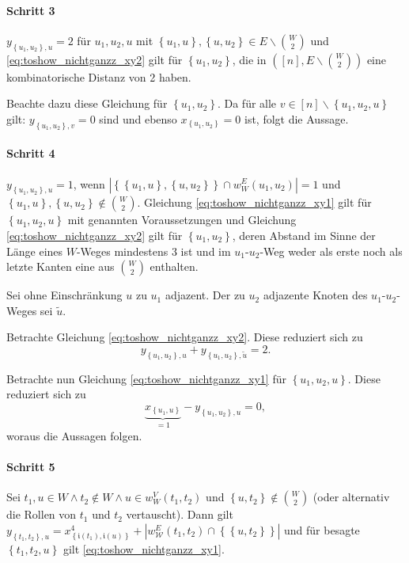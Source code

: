 \documentclass[10p,a4paper,BCOR = 12mm, DIV=15]{scrbook}
\begin{document}
\begin{bew}
\paragraph{Schritt 3}
$y_{\left\{u_1, u_2\right\}, u} = 2$ für $u_1, u_2, u$ mit $\left\{u_1, u\right\}, \left\{u, u_2\right\} \in E \backslash {W \choose 2}$ und \eqref{eq:toshow_nichtganzz_xy2} gilt für $\left\{u_1, u_2\right\}$, die in $\left(\left[n\right], E \backslash  {W \choose 2}\right)$ eine kombinatorische Distanz von 2 haben.

Beachte dazu diese Gleichung für $\left\{u_1, u_2\right\}$. Da für alle $v \in \left[n\right] \backslash \left\{u_1, u_2, u\right\}$ gilt: $y_{\left\{u_1, u_2\right\}, v}  = 0$ sind und ebenso $x_{\left\{u_1, u_2\right\}} = 0$ ist, folgt die Aussage.

\paragraph{Schritt 4}
$y_{\left\{u_1, u_2\right\}, u} = 1$, wenn $\left|\left\{\left\{u_1, u\right\}, \left\{u, u_2\right\}\right\} \cap w_W^E\left(u_1, u_2\right)\right| = 1$ und $\left\{u_1, u\right\}, \left\{u, u_2\right\} \notin {W \choose 2}$. Gleichung \eqref{eq:toshow_nichtganzz_xy1} gilt für $\left\{u_1, u_2, u\right\}$ mit genannten Voraussetzungen und
Gleichung \eqref{eq:toshow_nichtganzz_xy2} gilt für $\left\{u_1, u_2\right\}$, deren Abstand im Sinne der Länge eines $W$-Weges mindestens 3 ist und im $u_1$-$u_2$-Weg weder als erste noch als letzte Kanten eine aus ${W \choose 2}$ enthalten.

Sei ohne Einschränkung $u$ zu $u_1$ adjazent. Der zu $u_2$ adjazente Knoten des $u_1$-$u_2$-Weges sei $\widetilde{u}$.

Betrachte Gleichung \eqref{eq:toshow_nichtganzz_xy2}. Diese reduziert sich zu
\begin{displaymath}
y_{\left\{u_1, u_2\right\}, u} + y_{\left\{u_1, u_2\right\}, \widetilde{u}} = 2.
\end{displaymath}

Betrachte nun Gleichung \eqref{eq:toshow_nichtganzz_xy1} für $\left\{u_1, u_2, u\right\}$. Diese reduziert sich zu
\begin{displaymath}
\underbrace{x_{\left\{u_1, u\right\}}}_{=1} - y_{\left\{u_1, u_2\right\}, u} = 0,
\end{displaymath}
woraus die Aussagen folgen.

\paragraph{Schritt 5} Sei $t_1, u \in W \wedge t_2 \notin W \wedge u \in w_W^V\left(t_1, t_2\right)$ und $\left\{u, t_2\right\} \notin {W \choose 2}$ (oder alternativ die Rollen von $t_1$ und $t_2$ vertauscht). Dann gilt $y_{\left\{t_1, t_2\right\}, u} = x^{4}_{\left\{\mathfrak{i}\left(t_1\right), \mathfrak{i}\left(u\right)\right\}} + \left|w_{\mathcal{W}}^E\left(t_1, t_2\right) \cap \left\{\left\{u, t_2\right\}\right\}\right|$ und für besagte $\left\{t_1, t_2, u\right\}$ gilt \eqref{eq:toshow_nichtganzz_xy1}.


\end{bew}
\end{document}
